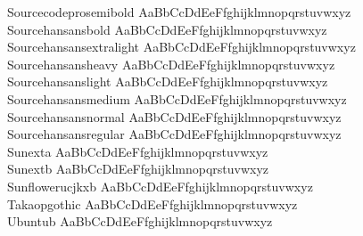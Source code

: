 \begin{tabbing}
Sourcecodeprosemibold \> { AaBbCcDdEeFfghijklmnopqrstuvwxyz} \\
Sourcehansansbold \> { AaBbCcDdEeFfghijklmnopqrstuvwxyz} \\
Sourcehansansextralight \> { AaBbCcDdEeFfghijklmnopqrstuvwxyz} \\
Sourcehansansheavy \> { AaBbCcDdEeFfghijklmnopqrstuvwxyz} \\
Sourcehansanslight \> { AaBbCcDdEeFfghijklmnopqrstuvwxyz} \\
Sourcehansansmedium \> { AaBbCcDdEeFfghijklmnopqrstuvwxyz} \\
Sourcehansansnormal \> { AaBbCcDdEeFfghijklmnopqrstuvwxyz} \\
Sourcehansansregular \> { AaBbCcDdEeFfghijklmnopqrstuvwxyz} \\
Sunexta \> { AaBbCcDdEeFfghijklmnopqrstuvwxyz} \\
Sunextb \> { AaBbCcDdEeFfghijklmnopqrstuvwxyz} \\
Sunflowerucjkxb \> { AaBbCcDdEeFfghijklmnopqrstuvwxyz} \\
Takaopgothic \> { AaBbCcDdEeFfghijklmnopqrstuvwxyz} \\
Ubuntub \> { AaBbCcDdEeFfghijklmnopqrstuvwxyz} \\

\end{tabbing}
